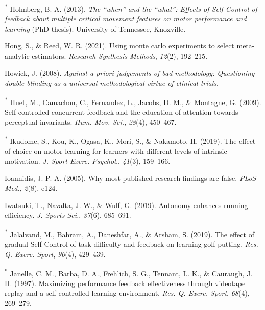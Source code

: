 \documentclass[
  english,
  man, donotrepeattitle,floatsintext]{apa7}
\newlength{\cslhangindent}
\newlength{\cslentryspacingunit} %
\newenvironment{CSLReferences}[2] %
 {%
  \setlength{\parindent}{0pt}
  \ifodd #1
  \let\oldpar\par
  \def\par{\hangindent=\cslhangindent\oldpar}
  \fi
  \setlength{\parskip}{#2\cslentryspacingunit}
 }%
 {}
\begin{document}
\begin{CSLReferences}{1}{0}
\leavevmode{}%
\textsuperscript{*} Holmberg, B. A. (2013). \emph{The {``when''} and the {``what''}: Effects of {Self-Control} of feedback about multiple critical movement features on motor performance and learning} (PhD thesis). University of Tennessee, Knoxville.

\leavevmode{}%
Hong, S., \& Reed, W. R. (2021). Using monte carlo experiments to select meta-analytic estimators. \emph{Research Synthesis Methods}, \emph{12}(2), 192--215.

\leavevmode{}%
Howick, J. (2008). \emph{Against a priori judgements of bad methodology: Questioning double-blinding as a universal methodological virtue of clinical trials}.

\leavevmode{}%
\textsuperscript{*} Huet, M., Camachon, C., Fernandez, L., Jacobs, D. M., \& Montagne, G. (2009). Self-controlled concurrent feedback and the education of attention towards perceptual invariants. \emph{Hum. Mov. Sci.}, \emph{28}(4), 450--467.

\leavevmode{}%
\textsuperscript{*} Ikudome, S., Kou, K., Ogasa, K., Mori, S., \& Nakamoto, H. (2019). The effect of choice on motor learning for learners with different levels of intrinsic motivation. \emph{J. Sport Exerc. Psychol.}, \emph{41}(3), 159--166.

\leavevmode{}%
Ioannidis, J. P. A. (2005). Why most published research findings are false. \emph{PLoS Med.}, \emph{2}(8), e124.

\leavevmode{}%
Iwatsuki, T., Navalta, J. W., \& Wulf, G. (2019). Autonomy enhances running efficiency. \emph{J. Sports Sci.}, \emph{37}(6), 685--691.

\leavevmode{}%
\textsuperscript{*} Jalalvand, M., Bahram, A., Daneshfar, A., \& Arsham, S. (2019). The effect of gradual {Self-Control} of task difficulty and feedback on learning golf putting. \emph{Res. Q. Exerc. Sport}, \emph{90}(4), 429--439.

\leavevmode{}%
\textsuperscript{*} Janelle, C. M., Barba, D. A., Frehlich, S. G., Tennant, L. K., \& Cauraugh, J. H. (1997). Maximizing performance feedback effectiveness through videotape replay and a self-controlled learning environment. \emph{Res. Q. Exerc. Sport}, \emph{68}(4), 269--279.


\end{CSLReferences}
\end{document}
